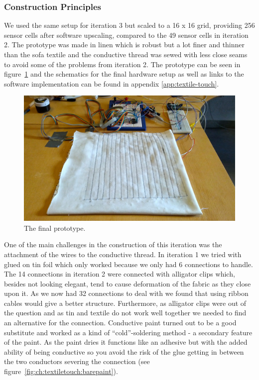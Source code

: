 \subsubsection{Construction Principles}
We used the same setup for iteration 3 but scaled to a 16 x 16 grid, providing 256 sensor cells after software upscaling, compared to the 49 sensor cells in iteration 2.
The prototype was made in linen which is robust but a lot finer and thinner than the sofa textile and the conductive thread was sewed with less close seams to avoid some of the problems from iteration 2.
The prototype can be seen in figure~\ref{fig:ch:textiletouch:final_prototype} and the schematics for the final hardware setup as well as links to the software implementation can be found in appendix \ref{app:textile-touch}.

\begin{figure}[h]
  \centering
  \includegraphics[width=.9\textwidth]{figures/touch/final_prototype}
  \caption{The final prototype.}
  \label{fig:ch:textiletouch:final_prototype}
\end{figure}

One of the main challenges in the construction of this iteration was the attachment of the wires to the conductive thread.
In iteration 1 we tried with glued on tin foil which only worked because we only had 6 connections to handle.
The 14 connections in iteration 2 were connected with alligator clips which, besides not looking elegant, tend to cause deformation of the fabric as they close upon it.
As we now had 32 connections to deal with we found that using ribbon cables would give a better structure.
Furthermore, as alligator clips were out of the question and as tin and textile do not work well together we needed to find an alternative for the connection.
Conductive paint turned out to be a good substitute and worked as a kind of ``cold''-soldering method - a secondary feature of the paint.
As the paint dries it functions like an adhesive but with the added ability of being conductive so you avoid the risk of the glue getting in between the two conductors severing the connection (see figure~\ref{fig:ch:textiletouch:barepaint}).

